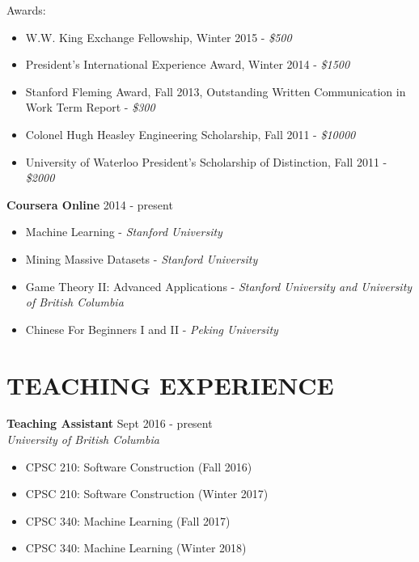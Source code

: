 \documentclass[10pt]{res} %
\begin{document}
\begin{resume}
Awards:
\begin{itemize} 
    \item W.W. King Exchange Fellowship, Winter 2015 - {\sl\$500}
    \item President's International Experience Award, Winter 2014 - {\sl\$1500}
    \item Stanford Fleming Award, Fall 2013, Outstanding Written Communication in Work Term Report - {\sl\$300}
    \item Colonel Hugh Heasley Engineering Scholarship, Fall 2011 - {\sl\$10000}
    \item University of Waterloo President's Scholarship of Distinction, Fall 2011 - {\sl\$2000}
\end{itemize}

\textbf {Coursera Online} \hfill 2014 - present \\
\begin{itemize} 
    \item Machine Learning - {\sl Stanford University}
    \item Mining Massive Datasets - {\sl Stanford University}
    \item Game Theory II: Advanced Applications - {\sl Stanford University and University of British Columbia}
    \item Chinese For Beginners I and II - {\sl Peking University}
\end{itemize}


\section{TEACHING EXPERIENCE}

\vspace{0.2in} %

\textbf{Teaching Assistant} \hfill Sept 2016 - present \\
{\sl University of British Columbia }
\begin{itemize}
    \item CPSC 210: Software Construction (Fall 2016)
    \item CPSC 210: Software Construction (Winter 2017)
    \item CPSC 340: Machine Learning (Fall 2017)
    \item CPSC 340: Machine Learning (Winter 2018)
\end{itemize}


\end{resume}
\end{document}
